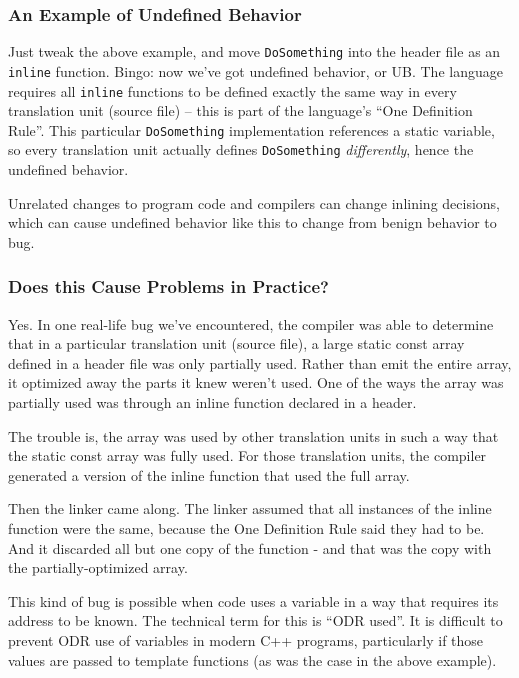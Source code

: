 \subsubsection{An Example of Undefined Behavior}
Just tweak the above example, and move \texttt{DoSomething} into the header file as an \texttt{inline} function. Bingo: now we’ve got undefined behavior, or UB. The language requires all \texttt{inline} functions to be defined exactly the same way in every translation unit (source file) – this is part of the language’s \enquote{One Definition Rule}. This particular \texttt{DoSomething} implementation references a static variable, so every translation unit actually defines \texttt{DoSomething} \emph{differently}, hence the undefined behavior.

Unrelated changes to program code and compilers can change inlining decisions, which can cause undefined behavior like this to change from benign behavior to bug.

\subsubsection{Does this Cause Problems in Practice?}
Yes. In one real-life bug we’ve encountered, the compiler was able to determine that in a particular translation unit (source file), a large static const array defined in a header file was only partially used. Rather than emit the entire array, it optimized away the parts it knew weren’t used. One of the ways the array was partially used was through an inline function declared in a header.

The trouble is, the array was used by other translation units in such a way that the static const array was fully used. For those translation units, the compiler generated a version of the inline function that used the full array.

Then the linker came along. The linker assumed that all instances of the inline function were the same, because the One Definition Rule said they had to be. And it discarded all but one copy of the function - and that was the copy with the partially-optimized array.

This kind of bug is possible when code uses a variable in a way that requires its address to be known. The technical term for this is \enquote{ODR used}. It is difficult to prevent ODR use of variables in modern C++ programs, particularly if those values are passed to template functions (as was the case in the above example).


